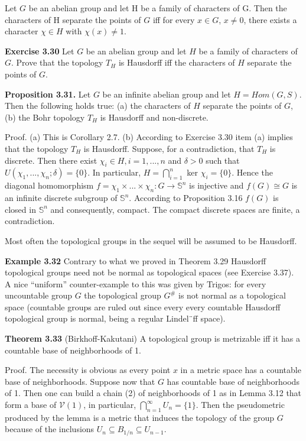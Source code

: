 \documentclass[12pt]{article}
\begin{document}
            Let $G$ be an abelian group and let H be a family of characters of G. Then the characters of H separate the
        points of $G$ iff for every $x \in G$, $x \neq 0$, there exists a character $\chi \in H$ with $\chi(x) \neq 1$.


    \textbf{Exercise 3.30} Let $G$ be an abelian group and let $H$ be a family of characters of $G$. Prove that the topology
    $T_H$ is Hausdorff iff the characters of $H$ separate the points of $G$.


    \textbf{Proposition 3.31.} Let $G$ be an infinite abelian group and let $H = Hom(G,S)$. Then the following holds true:
    (a) the characters of $H$ separate the points of $G$,
    (b) the Bohr topology $T_H$ is Hausdorff and non-discrete. 
    
    Proof.
    (a) This is Corollary 2.7.
    (b) According to Exercise 3.30 item (a) implies
    that the topology $T_H$ is Hausdorff. Suppose, for a contradiction, that $T_H$ is discrete. Then there exist $\chi_i \in H, i = 1, . . . , n$ and
    $\delta > 0$ such that $U(\chi_1, . . . , \chi_n; \delta) = \{0\}$. In particular, $H = \bigcap^n_{i=1}$ ker $\chi_i = \{0\}$. Hence the diagonal homomorphism
    $f = \chi_1 \times . . . \times  \chi_n : G \to  \mathbb{S}^n$ is injective and $f(G) \cong G$ is an infinite discrete subgroup of $\mathbb{S}^n$. According to
    Proposition 3.16 $f(G)$ is closed in $\mathbb{S}^n$ and consequently, compact. The compact discrete spaces are finite, a contradiction.


    Most often the topological groups in the sequel will be assumed to be Hausdorff.


    \textbf{Example 3.32} Contrary to what we proved in Theorem 3.29 Hausdorff topological groups need not be normal
    as topological spaces (see Exercise 3.37). A nice “uniform” counter-example to this was given by Trigos: for
    every uncountable group $G$ the topological group $G^{\#}$ is not normal as a topological space (countable groups are
    ruled out since every every countable Hausdorff topological group is normal, being a regular Lindel¨ff space).
    

    \textbf{Theorem 3.33} (Birkhoff-Kakutani) A topological group is metrizable iff it has a countable base of
    neighborhoods of 1.


            Proof. The necessity is obvious as every point $x$ in a metric space has a countable base of neighborhoods. Suppose
        now that $G$ has countable base of neighborhoods of 1. Then one can build a chain (2) of neighborhoods of 1 as
        in Lemma 3.12 that form a base of $\mathcal{V}(1)$, in particular, $\bigcap^{\infty}_{n=1} U_n = \{1\}$. Then the pseudometric produced by the
        lemma is a metric that induces the topology of the group $G$ because of the inclusions $U_n \subseteq B_{1/n} \subseteq U_{n-1}$.
\end{document}
